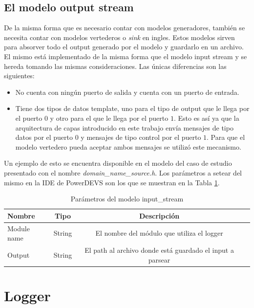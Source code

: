 \documentclass[10pt,a4paper]{article}
\begin{document}
\subsection{El modelo output stream}
De la misma forma que es necesario contar con modelos generadores, también se necesita contar con modelos vertederos o \textit{sink} en ingles. Estos modelos sirven para absorver todo el output generado por el modelo y guardarlo en un archivo. El mismo está implementado de la misma forma que el modelo input stream y se hereda tomando las mismas consideraciones. Las únicas diferencias son las siguientes: \\

\begin{itemize}
\item No cuenta con ningún puerto de salida y cuenta con un puerto de entrada.
\item Tiene dos tipos de datos template, uno para el tipo de output que le llega por el puerto $0$ y otro para el que le llega por el puerto $1$. Esto es así ya que la arquitectura de capas introducido en este trabajo envía mensajes de tipo datos por el puerto $0$ y mensajes de tipo control por el puerto $1$. Para que el modelo vertedero pueda aceptar ambos mensajes se utilizó este mecanismo.
\end{itemize}

Un ejemplo de esto se encuentra disponible en el modelo del caso de estudio presentado con el nombre \textit{domain\_name\_source.h}. Los parámetros a setear del mismo en la IDE de PowerDEVS son los que se muestran en la Tabla \ref{table: output stream parameters}.
\begin{table}[h]
\begin{tabular}{|l|c|c|c|}
  \hline
  \textbf{Nombre} & \textbf{Tipo} & \textbf{Descripción} \\
  \hline
  Module name & String & El nombre del módulo que utiliza el logger \\
  \hline
  Output & String & El path al archivo donde está guardado el input a parsear \\
  \hline
\end{tabular}
\caption{Parámetros del modelo input\_stream}
\label{table: output stream parameters}
\end{table}

\newpage

\section{Logger}
\end{document}
